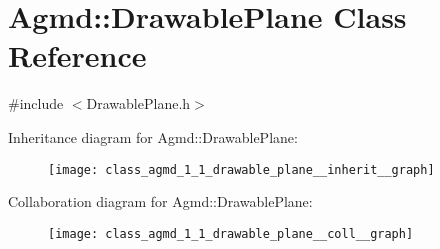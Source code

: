 \hypertarget{class_agmd_1_1_drawable_plane}{\section{Agmd\+:\+:Drawable\+Plane Class Reference}
\label{class_agmd_1_1_drawable_plane}
}


{\ttfamily \#include $<$Drawable\+Plane.\+h$>$}



Inheritance diagram for Agmd\+:\+:Drawable\+Plane\+:\nopagebreak
\begin{figure}[H]
\begin{center}
\leavevmode
\texttt{[image: class\_agmd\_1\_1\_drawable\_plane\_\_inherit\_\_graph]}
\end{center}
\end{figure}


Collaboration diagram for Agmd\+:\+:Drawable\+Plane\+:\nopagebreak
\begin{figure}[H]
\begin{center}
\leavevmode
\texttt{[image: class\_agmd\_1\_1\_drawable\_plane\_\_coll\_\_graph]}
\end{center}
\end{figure}
